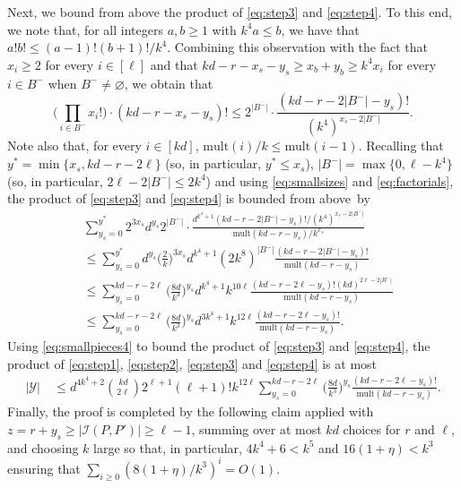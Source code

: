 \documentclass[reqno,final,a4paper]{amsart}
\theoremstyle{definition}
\newcommand{\cI}{\mathcal{I}}
\newcommand{\cY}{\mathcal{Y}}
\newcommand{\mult}{\mathrm{mult}}
\newcommand{\1}{\mathbbm{1}}
\begin{document}
Next, we bound from above the product of \eqref{eq:step3} and \eqref{eq:step4}.
To this end, we note that, for all integers $a,b\ge 1$ with $k^4a\leq b$, we have that $a!b!\leq (a-1)!(b+1)!/k^4$.
Combining this observation with the fact that $x_i\ge 2$ for every $i\in [\ell]$ and that $kd-r-x_s-y_s\ge x_b+y_b\ge k^4 x_i$ for every $i\in B^-$ when $B^-\neq \varnothing$, we obtain that
\begin{equation}\label{eq:factorials}
\bigg(\prod_{i\in B^-} x_i!\bigg)\cdot (kd-r-x_s-y_s)!\le 2^{|B^-|}\cdot \frac{(kd-r-2|B^-|-y_s)!}{(k^4)^{x_s-2|B^-|}}.
\end{equation}
Note also that, for every $i\in [kd]$, $\mult(i)/k\leq \mult(i-1)$. Recalling that $y^*=  \min\{x_s, kd-r-2\ell\} $ (so, in particular, $y^*\le x_s$), $|B^-|=\max\{0,\ell-k^4\}$ (so, in particular, $2\ell-2|B^-|\leq 2k^4$) and using \eqref{eq:smallsizes} and \eqref{eq:factorials}, the product of \eqref{eq:step3} and \eqref{eq:step4} is bounded from above~by 
\begin{align}\label{eq:smallpieces4}
  &\sum_{y_s=0}^{y^*} 2^{3x_s} d^{y_s} 2^{|B^-|}\cdot \frac{d^{k^4+1}(kd-r-2|B^-|-y_s)!/(k^4)^{x_s-2|B^-|}}{\mult(kd-r-y_s)/k^{x_s}} \nonumber\\
    & \leq \sum_{y_s=0}^{y^*} d^{y_s} \bigg(\frac{2}{k}\bigg)^{3x_s} d^{k^4+1}(2k^8)^{|B^-|} \frac{(kd-r-2|B^-|-y_s)!}{\mult(kd-r-y_s)} \nonumber\\
    &\leq \sum_{y_s=0}^{kd-r-2\ell} \bigg(\frac{8d}{k^3}\bigg)^{y_s} d^{k^4+1} k^{10\ell} \frac{(kd-r-2\ell-y_s)! (kd)^{2\ell-2|B^-|}}{\mult(kd-r-y_s)}\nonumber\\
    &\leq \sum_{y_s=0}^{kd-r-2\ell} \bigg(\frac{8d}{k^3}\bigg)^{y_s} d^{3k^4+1} k^{12\ell} \frac{(kd-r-2\ell-y_s)!}{\mult(kd-r-y_s)}.
\end{align}
Using \eqref{eq:smallpieces4} to bound the product of \eqref{eq:step3} and \eqref{eq:step4}, the product of \eqref{eq:step1}, \eqref{eq:step2}, \eqref{eq:step3} and \eqref{eq:step4} is at most
\begin{align*}
|\cY|&\ \leq  d^{4k^4+2} \binom{kd}{2\ell} 2^{\ell+1} (\ell+1)! k^{12\ell} 
\sum_{y_s=0}^{kd-r-2\ell} \bigg(\frac{8d}{k^3}\bigg)^{y_s} \frac{(kd-r-2\ell-y_s)!}{\mult(kd-r-y_s)}.
\end{align*}
Finally, the proof is completed by the following claim applied with $z=r+y_s\ge |\cI(P,P')|\ge \ell-1$, summing over at most $kd$ choices for $r$ and $\ell$, and choosing $k$ large so that, in particular, $4k^4+6 < k^5$ and $16(1+\eta) < k^3$ ensuring that $\sum_{i\ge 0} (8(1+\eta)/k^3)^i = O(1)$.
\end{document}
